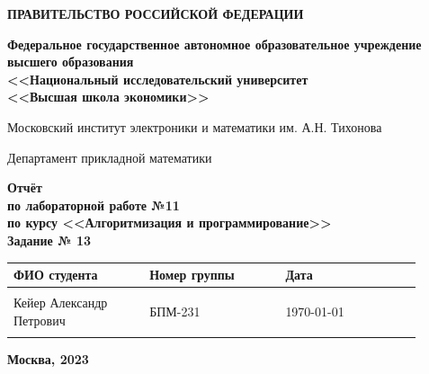 \documentclass[12pt]{article}
\begin{document}
	
	\thispagestyle{empty}
	\begin{center}
		\textbf{ПРАВИТЕЛЬСТВО РОССИЙСКОЙ ФЕДЕРАЦИИ}
		
		\vspace{5ex}
		
		\textbf{Федеральное государственное автономное образовательное учреждение \\ высшего образования \\ <<Национальный исследовательский университет \\ <<Высшая школа экономики>>}
	\end{center}
	\vspace{5ex}
	
	\begin{center}
		Московский институт электроники и математики им. А.Н. Тихонова  
		
		\vspace{5ex}
		
		Департамент прикладной математики
		
		\vspace{10ex}
		\textbf{Отчёт \\ по лабораторной работе №11 \\ по курсу <<Алгоритмизация и программирование>> \\ Задание № 13}
		\vspace{7ex}
		
	\end{center}
	
	\begin{center} 
		\begin{tabular}{| p{0.3\linewidth}| p{0.3\linewidth}| p{0.3\linewidth}|}
			\hline	
			ФИО студента & Номер группы & Дата \\  \hline
			& & \\  
			Кейер Александр \newline Петрович & БПМ-231 & \today\\  
			& & \\  \hline		
		\end{tabular}
	\end{center}
	
	\begin{center}
		\vspace{3ex}
		
		\vfill
		
		\normalsize
		
		\textbf{Москва, 2023}
	\end{center}
	
\end{document}
